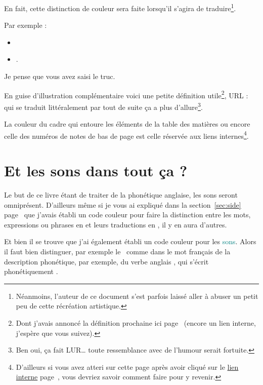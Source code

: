 En fait, cette distinction de couleur sera faite lorsqu'il s'agira de
traduire\footnote{Néanmoins, l'auteur de ce document s'est parfois 
  laissé aller à abuser un petit peu de cette récréation artistique.}.

Par exemple :
\begin{itemize}
\item {}
\item {}.  
\end{itemize}

Je pense que vous avez saisi le truc.

En guise d'illustration complémentaire voici une petite définition
utile\footnote{Dont j'avais annoncé la définition prochaine ici
  page~\pageref{sec:link} (encore un lien interne, j'espère que vous
  suivez).}, URL :  qui se traduit
littéralement par  tout de
suite ça a plus d'allure\footnote{Ben oui, ça fait LUR\dots\xspace toute
  ressemblance avec de l'humour serait fortuite.}.

La couleur du cadre qui entoure les éléments de la table des matières
ou encore celle des numéros de notes de bas de page est celle réservée
aux \hypertarget{linkin}{liens internes}\footnote{D'ailleurs si vous
  avez atteri sur cette page après avoir cliqué sur le
  \hyperlink{retour}{lien interne} page~\pageref{retour}, vous devriez
savoir comment faire pour y revenir.}. 

\newpage

\section{Et les sons dans tout ça ?}\label{sec:phonetics}

Le but de ce livre étant de traiter de la phonétique anglaise, les
sons seront omniprésent. D'ailleurs même si je vous ai expliqué dans
la section~\ref{sec:side} page~\pageref{sec:side} que j'avais établi un code
couleur pour faire la distinction entre les mots, expressions ou
phrases en  et leurs traductions en , il
y en aura d'autres.

Et bien il se trouve que j'ai également établi un code couleur pour
les \textcolor{teal}{sons}. Alors il faut bien distinguer, par exemple
le\son~ comme dans le mot français  de la
description phonétique, par exemple, du verbe anglais , qui
s'écrit phonétiquement .

